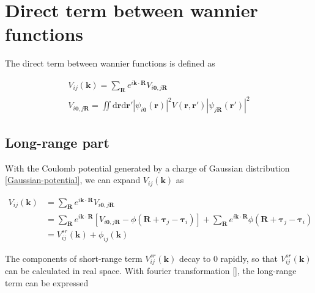 \section{Direct term between wannier functions}

The direct term between wannier functions is defined as

\begin{equation}
    \begin{gathered}
        V_{ij}(\boldsymbol{k}) = \sum_{\boldsymbol{R}} e^{i\boldsymbol{k}\cdot\boldsymbol{R}} V_{i\boldsymbol{0},j\boldsymbol{R}} \\
        V_{i\boldsymbol{0},j\boldsymbol{R}} 
            = \iint \mathrm{d} \boldsymbol{r} \mathrm{d} \boldsymbol{r}'
            \left| \psi_{i\boldsymbol{0}}^{}(\boldsymbol{r}) \right|^{2} 
                V(\boldsymbol{r},\boldsymbol{r}') 
            \left| \psi_{j\boldsymbol{R}}^{}(\boldsymbol{r}') \right|^{2} 
    \end{gathered}
\end{equation}

\subsection{Long-range part}

With the Coulomb potential generated by a charge of Gaussian distribution \eqref{Gaussian-potential},
we can expand $V_{ij}(\boldsymbol{k})$ as

\begin{equation}
  \begin{aligned}
    V_{ij}(\boldsymbol{k}) 
    &= \sum_{\boldsymbol{R}} e^{i\boldsymbol{k}\cdot\boldsymbol{R}} V_{i\boldsymbol{0},j\boldsymbol{R}} \\
    &= \sum_{\boldsymbol{R}} e^{i\boldsymbol{k}\cdot\boldsymbol{R}} \left[
        V_{i\boldsymbol{0},j\boldsymbol{R}} - \phi(\boldsymbol{R} + \boldsymbol{\tau}_j - \boldsymbol{\tau}_i)
      \right] 
      + \sum_{\boldsymbol{R}} e^{i\boldsymbol{k}\cdot\boldsymbol{R}} 
        \phi(\boldsymbol{R} + \boldsymbol{\tau}_j - \boldsymbol{\tau}_i) \\
    &= V_{ij}^{sr}(\boldsymbol{k}) + \phi_{ij}(\boldsymbol{k})
  \end{aligned}
\end{equation}

\noindent
The components of short-range term $V_{ij}^{sr}(\boldsymbol{k})$ decay to $0$ rapidly, 
so that $V_{ij}^{sr}(\boldsymbol{k})$ can be calculated in real space.
With fourier transformation \eqref{}, the long-range term can be expressed



